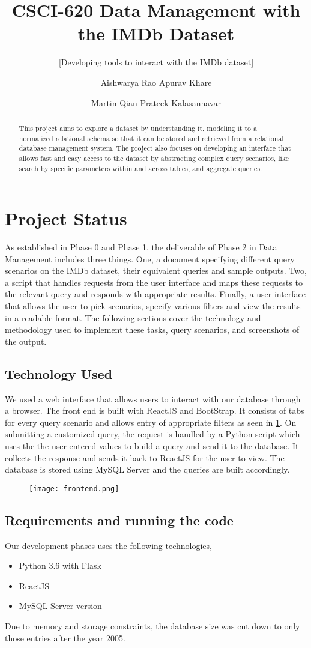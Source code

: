 \documentclass{sig-alternate}
\title{CSCI-620 Data Management with the IMDb Dataset}
\subtitle{[Developing tools to interact with the IMDb dataset]}
\author
{
	\alignauthor
	Aishwarya Rao
	\email{ar2711@rit.edu}
	\alignauthor
	Apurav Khare
	\email{ak2816@rit.edu}
	\and
	\alignauthor
	Martin Qian
	\email{jq3513@rit.edu}
	\alignauthor
	Prateek Kalasannavar
	\email{pk6685@rit.edu}
}
\begin{document}
	\maketitle
	\begin{abstract}
		This project aims to explore a dataset by understanding it, modeling it to a normalized relational schema so that it can be stored and retrieved from a relational database management system. The project also focuses on developing an interface that allows fast and easy access to the dataset by abstracting complex query scenarios, like search by specific parameters within and across tables, and aggregate queries.
	\end{abstract}
	
	\section{Project Status}
	As established in Phase 0 and Phase 1, the deliverable of Phase 2 in Data Management includes three things. One, a document specifying different query scenarios on the IMDb dataset, their equivalent queries and sample outputs. Two, a script that handles requests from the user interface and maps these requests to the relevant query and responds with appropriate results. Finally, a user interface that allows the user to pick scenarios, specify various filters and view the results in a readable format.
	The following sections cover the technology and methodology used to implement these tasks, query scenarios, and screenshots of the output. 
	\subsection{Technology Used}
	We used a web interface that allows users to interact with our database through a browser. The front end is built with ReactJS and BootStrap. It consists of tabs for every query scenario and allows entry of appropriate filters as seen in \ref{frontend}. On submitting a customized query, the request is handled by a Python script which uses the the user entered values to build a query and send it to the database. It collects the response and sends it back to ReactJS for the user to view. \newline
	The database is stored using MySQL Server and the queries are built accordingly. 
	\begin{figure}[ht]
		\texttt{[image: frontend.png]}
		\label{frontend}
		\centering
	\end{figure}
\subsection{Requirements and running the code}
Our development phases uses the following technologies,
\begin{itemize}
	\item Python 3.6 with Flask
	\item ReactJS 
	\item MySQL Server version - 
\end{itemize}
Due to memory and storage constraints, the database size was cut down to only those entries after the year 2005. 
\end{document}
